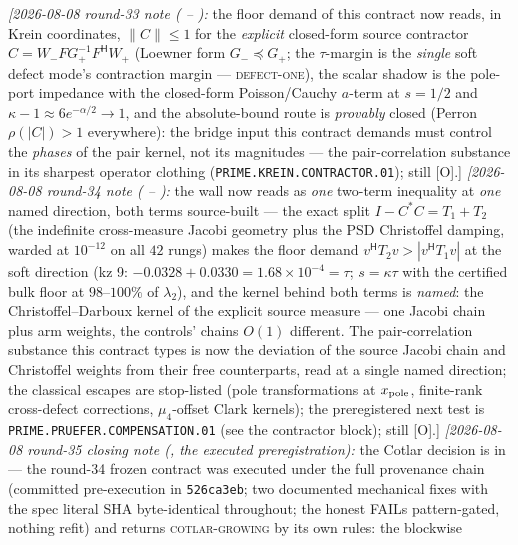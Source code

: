 {\emph{[2026-08-08 round-33 note
( --
):} the floor demand
of this contract now reads, in Krein coordinates, $\|C\| \le 1$
for the \emph{explicit} closed-form source contractor $C =
W_-FG_+^{-1}F^{\mathsf H}W_+$ (Loewner form $G_- \preceq G_+$;
the $\tau$-margin is the \emph{single} soft defect mode's
contraction margin --- \textsc{defect-one}), the scalar shadow
is the pole-port impedance with the closed-form Poisson/Cauchy
$a$-term at $s = 1/2$ and $\kappa - 1 \approx 6e^{-\alpha/2}
\to 1$, and the absolute-bound route is \emph{provably} closed
(Perron $\rho(|C|) > 1$ everywhere): the bridge input this
contract demands must control the \emph{phases} of the pair
kernel, not its magnitudes --- the pair-correlation substance
in its sharpest operator clothing
(\texttt{PRIME.KREIN.CONTRACTOR.01}); still [O].]
\emph{[2026-08-08 round-34 note
( --
):} the wall now reads as
\emph{one} two-term inequality at \emph{one} named direction,
both terms source-built --- the exact split $I - C^*C = T_1 +
T_2$ (the indefinite cross-measure Jacobi geometry plus the PSD
Christoffel damping, warded at $10^{-12}$ on all $42$ rungs)
makes the floor demand $v^{\mathsf H}T_2v > |v^{\mathsf H}T_1v|$
at the soft direction (kz 9: $-0.0328 + 0.0330 = 1.68\times
10^{-4} = \tau$; $s = \kappa\tau$ with the certified bulk floor
at $98$--$100\%$ of $\lambda_2$), and the kernel behind both
terms is \emph{named}: the Christoffel--Darboux kernel of the
explicit source measure --- one Jacobi chain plus arm weights,
the controls' chains $O(1)$ different.  The pair-correlation
substance this contract types is now the deviation of the source
Jacobi chain and Christoffel weights from their free
counterparts, read at a single named direction; the classical
escapes are stop-listed (pole transformations at $x_{\rm pole}$,
finite-rank cross-defect corrections, $\mu_4$-offset Clark
kernels); the preregistered next test is
\texttt{PRIME.PRUEFER.COMPENSATION.01} (see the contractor
block); still [O].]
\emph{[2026-08-08 round-35 closing note
(, the executed
preregistration):} the Cotlar decision is in --- the round-34
frozen contract was executed under the full provenance chain
(committed pre-execution in \texttt{526ca3eb}; two documented
mechanical fixes with the spec literal SHA byte-identical
throughout; the honest FAILs pattern-gated, nothing refit) and
returns \textsc{cotlar-growing} by its own rules: the blockwise
}
